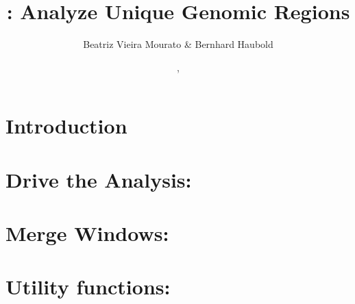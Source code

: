 \documentclass[a4paper]{report}
\begin{document}
\pagestyle{noweb}

\title{: Analyze Unique Genomic Regions}
\author{Beatriz Vieira Mourato \& Bernhard Haubold}
\date{\!\!, }
\maketitle

\tableofcontents

\chapter{Introduction}

\chapter{Drive the Analysis: }

\chapter{Merge Windows: }\label{ch:me}

\chapter{Utility functions: }\label{ch:uti}


\end{document}
